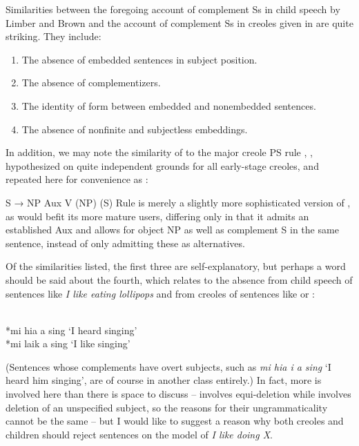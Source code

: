 Similarities between the foregoing account of complement Ss in child speech by Limber and Brown and the account of complement Ss in creoles given in  are quite striking. They include:

\begin{enumerate}
\item The absence of embedded sentences in subject position.
\item The absence of complementizers.
\item The identity of form between embedded and nonembedded sentences.
\item The absence of nonfinite and subjectless embeddings.
\end{enumerate}
 
In addition, we may note the similarity of  to the major creole PS rule , , hypothesized on quite independent grounds for all early-stage creoles, and repeated here for convenience as :

\ea\label{ex:3:40}
 S → NP Aux V (NP) (S) 
\z
Rule  is merely a slightly more sophisticated version of , as would befit its more mature users, differing only in that it admits an established Aux and allows for object NP as well as complement S in the same sentence, instead of only admitting these as alternatives.

Of the similarities listed, the first three are self-explanatory, but perhaps a word should be said about the fourth, which relates to the absence from child speech of sentences like \textit{I like eating lollipops} and from creoles of sentences like  or :

\ea\label{ex:3:41}
\langinfo{\langGC}{}{}\\
*mi hia a sing
\glt `I heard singing'
\z
\ea\label{ex:3:42}
\langinfo{\langGC}{}{}\\
*mi laik a sing
\glt `I like singing'
\z

\noindent (Sentences whose complements have overt subjects, such as \textit{mi hia i a sing} `I heard him singing', are of course in another class entirely.) In fact, more is involved here than there is space to discuss --  involves equi-deletion while  involves deletion of an unspecified subject, so the reasons for their ungrammaticality cannot be the same -- but I would like to suggest a reason why both creoles and children should reject sentences on the model of \textit{I like doing X}.

